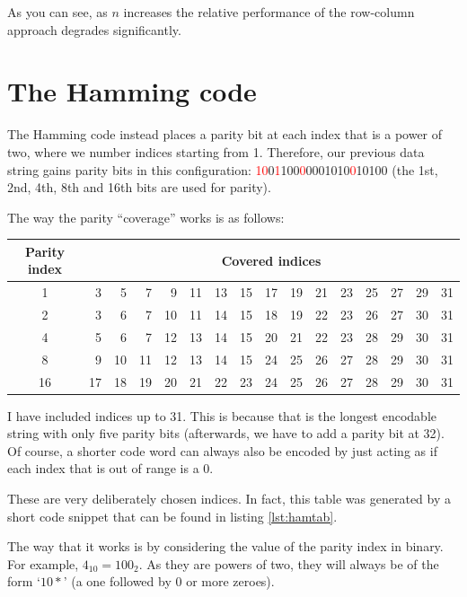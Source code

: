 \documentclass{article}
\begin{document}
    As you can see, as $n$ increases the relative performance of the row-column
    approach degrades significantly.

    \section{The Hamming code}

    The Hamming code instead places a parity bit at each index that is a power
    of two, where we number indices starting from 1. Therefore, our previous
    data string gains parity bits in this configuration:
    \textcolor{red}{10}0\textcolor{red}{1}100\textcolor{red}{0}0001010\textcolor{red}{0}10100
    (the 1st, 2nd, 4th, 8th and 16th bits are used for parity).

    The way the parity ``coverage'' works is as follows:

\begin{center}
    \begin{tabular}{crrrrrrrrrrrrrrr}
    \toprule
    Parity index & \multicolumn{15}{c}{Covered indices} \\
    \midrule
    1 & 3 & 5 & 7 & 9 & 11 & 13 & 15 & 17 & 19 & 21 & 23 & 25 & 27 & 29 & 31 \\
    2 & 3 & 6 & 7 & 10 & 11 & 14 & 15 & 18 & 19 & 22 & 23 & 26 & 27 & 30 & 31 \\
    4 & 5 & 6 & 7 & 12 & 13 & 14 & 15 & 20 & 21 & 22 & 23 & 28 & 29 & 30 & 31 \\
    8 & 9 & 10 & 11 & 12 & 13 & 14 & 15 & 24 & 25 & 26 & 27 & 28 & 29 & 30 & 31 \\
    16 & 17 & 18 & 19 & 20 & 21 & 22 & 23 & 24 & 25 & 26 & 27 & 28 & 29 & 30 & 31 \\
    \bottomrule
    \end{tabular}
\end{center}

    I have included indices up to 31. This is because that is the longest
    encodable string with only five parity bits (afterwards, we have to add a
    parity bit at 32). Of course, a shorter code word can always also be encoded
    by just acting as if each index that is out of range is a 0.

    These are very deliberately chosen indices. In fact, this table was
    generated by a short code snippet that can be found in listing
    \ref{lst:hamtab}.

    The way that it works is by considering the value of the parity index in
    binary. For example, $4_{10}=100_{2}$. As they are powers of two, they will
    always be of the form `$10*$' (a one followed by 0 or more zeroes).
\end{document}
